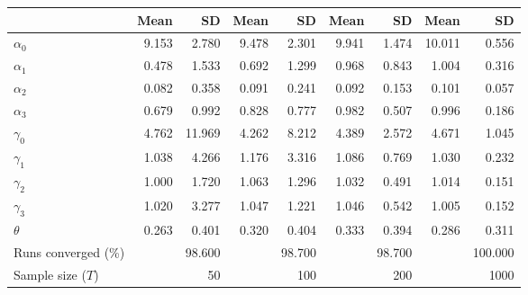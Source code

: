 
\begin{tabular}[t]{lrrrrrrrr}
\toprule
  & Mean & SD & Mean  & SD  & Mean   & SD   & Mean    & SD   \\
\midrule
$\alpha_{0}$ & 9.153 & 2.780 & 9.478 & 2.301 & 9.941 & 1.474 & 10.011 & 0.556\\
$\alpha_{1}$ & 0.478 & 1.533 & 0.692 & 1.299 & 0.968 & 0.843 & 1.004 & 0.316\\
$\alpha_{2}$ & 0.082 & 0.358 & 0.091 & 0.241 & 0.092 & 0.153 & 0.101 & 0.057\\
$\alpha_{3}$ & 0.679 & 0.992 & 0.828 & 0.777 & 0.982 & 0.507 & 0.996 & 0.186\\
$\gamma_{0}$ & 4.762 & 11.969 & 4.262 & 8.212 & 4.389 & 2.572 & 4.671 & 1.045\\
$\gamma_{1}$ & 1.038 & 4.266 & 1.176 & 3.316 & 1.086 & 0.769 & 1.030 & 0.232\\
$\gamma_{2}$ & 1.000 & 1.720 & 1.063 & 1.296 & 1.032 & 0.491 & 1.014 & 0.151\\
$\gamma_{3}$ & 1.020 & 3.277 & 1.047 & 1.221 & 1.046 & 0.542 & 1.005 & 0.152\\
$\theta$ & 0.263 & 0.401 & 0.320 & 0.404 & 0.333 & 0.394 & 0.286 & 0.311\\
Runs converged (\%) &  & 98.600 &  & 98.700 &  & 98.700 &  & 100.000\\
Sample size ($T$) &  & 50 &  & 100 &  & 200 &  & 1000\\
\bottomrule
\end{tabular}
